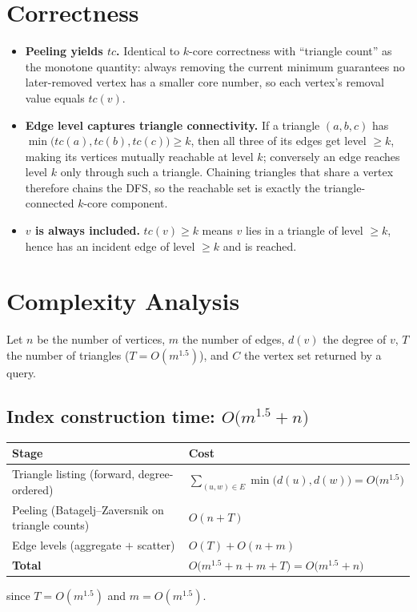 \documentclass[11pt]{article}
\begin{document}
\section{Correctness}
\begin{itemize}[leftmargin=1.4em, itemsep=3pt]
  \item \textbf{Peeling yields $tc$.} Identical to $k$-core correctness with
  ``triangle count'' as the monotone quantity: always removing the current
  minimum guarantees no later-removed vertex has a smaller core number, so each
  vertex's removal value equals $tc(v)$.
  \item \textbf{Edge level captures triangle connectivity.} If a triangle
  $(a,b,c)$ has $\min\big(tc(a),tc(b),tc(c)\big)\ge k$, then all three of its
  edges get level $\ge k$, making its vertices mutually reachable at level $k$;
  conversely an edge reaches level $k$ only through such a triangle. Chaining
  triangles that share a vertex therefore chains the DFS, so the reachable set is
  exactly the triangle-connected $k$-core component.
  \item \textbf{$v$ is always included.} $tc(v)\ge k$ means $v$ lies in a triangle
  of level $\ge k$, hence has an incident edge of level $\ge k$ and is reached.
\end{itemize}

\section{Complexity Analysis}
Let $n$ be the number of vertices, $m$ the number of edges, $d(v)$ the degree of
$v$, $T$ the number of triangles ($T=O(m^{1.5})$), and $C$ the vertex set
returned by a query.

\subsection{Index construction time: $O\big(m^{1.5}+n\big)$}
\begin{center}
\begin{tabular}{@{}ll@{}}
\toprule
\textbf{Stage} & \textbf{Cost}\\
\midrule
Triangle listing (forward, degree-ordered) &
  $\displaystyle\sum_{(u,w)\in E}\min\!\big(d(u),d(w)\big)=O\big(m^{1.5}\big)$\\
Peeling (Batagelj--Zaversnik on triangle counts) & $O(n+T)$\\
Edge levels (aggregate $+$ scatter) & $O(T)+O(n+m)$\\
\midrule
\textbf{Total} & $O\big(m^{1.5}+n+m+T\big)=O\big(m^{1.5}+n\big)$\\
\bottomrule
\end{tabular}
\end{center}
since $T=O(m^{1.5})$ and $m=O(m^{1.5})$.
\end{document}
